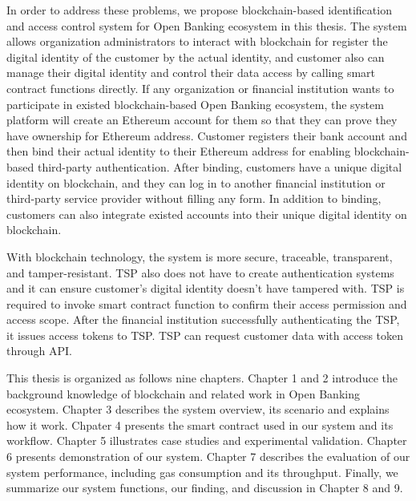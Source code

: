 In order to address these problems, we propose blockchain-based identification and access control system for Open Banking ecosystem in this thesis. The system allows organization administrators to interact with blockchain for register the digital identity of the customer by the actual identity, and customer also can manage their digital identity and control their data access by calling smart contract functions directly. If any organization or financial institution wants to participate in existed blockchain-based Open Banking ecosystem, the system platform will create an Ethereum account for them so that they can prove they have ownership for Ethereum address. Customer registers their bank account and then bind their actual identity to their Ethereum address for enabling blockchain-based third-party authentication. After binding, customers have a unique digital identity on blockchain, and they can log in to another financial institution or third-party service provider without filling any form. In addition to binding, customers can also integrate existed accounts into their unique digital identity on blockchain.\par
With blockchain technology, the system is more secure, traceable, transparent, and tamper-resistant. TSP also does not have to create authentication systems and it can ensure customer's digital identity doesn't have tampered with. TSP is required to invoke smart contract function to confirm their access permission and access scope. After the financial institution successfully authenticating the TSP, it issues access tokens to TSP. TSP can request customer data with access token through API.\par
This thesis is organized as follows nine chapters. Chapter 1 and 2 introduce the background knowledge of blockchain and related work in Open Banking ecosystem. Chapter 3 describes the system overview, its scenario and explains how it work. Chpater 4 presents the smart contract used in our system and its workflow. Chapter 5 illustrates case studies and experimental validation. Chapter 6 presents demonstration of our system. Chapter 7 describes the evaluation of our system performance, including gas consumption and its throughput. Finally, we summarize our system functions, our finding, and discussion in Chapter 8 and 9.\par